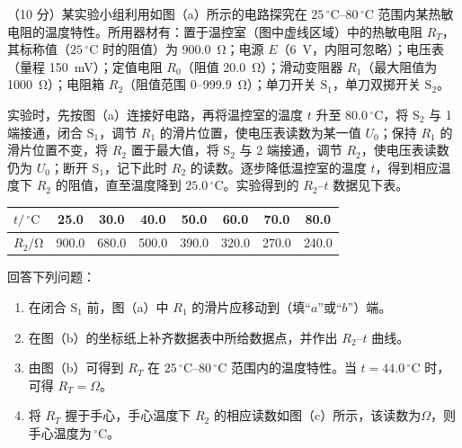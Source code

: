 \begin{question}
（10 分）某实验小组利用如图（a）所示的电路探究在 $25\,^{\circ}\mathrm{C}$--$80\,^{\circ}\mathrm{C}$ 范围内某热敏电阻的温度特性。所用器材有：置于温控室（图中虚线区域）中的热敏电阻 $R_{T}$，其标称值（$25\,^{\circ}\mathrm{C}$ 时的阻值）为 \SI{900.0}{\ohm}；电源 $E$（\SI{6}{\volt}，内阻可忽略）；电压表（量程 \SI{150}{\milli\volt}）；定值电阻 $R_{0}$（阻值 \SI{20.0}{\ohm}）；滑动变阻器 $R_{1}$（最大阻值为 \SI{1000}{\ohm}）；电阻箱 $R_{2}$（阻值范围 $0$--\SI{999.9}{\ohm}）；单刀开关 $\mathrm{S}_{1}$，单刀双掷开关 $\mathrm{S}_{2}$。


实验时，先按图（a）连接好电路，再将温控室的温度 $t$ 升至 $80.0\,^{\circ}\mathrm{C}$，将 $\mathrm{S}_{2}$ 与 1 端接通，闭合 $\mathrm{S}_{1}$，调节 $R_{1}$ 的滑片位置，使电压表读数为某一值 $U_{0}$；保持 $R_{1}$ 的滑片位置不变，将 $R_{2}$ 置于最大值，将 $\mathrm{S}_{2}$ 与 2 端接通，调节 $R_{2}$，使电压表读数仍为 $U_{0}$；断开 $\mathrm{S}_{1}$，记下此时 $R_{2}$ 的读数。逐步降低温控室的温度 $t$，得到相应温度下 $R_{2}$ 的阻值，直至温度降到 $25.0\,^{\circ}\mathrm{C}$。实验得到的 $R_{2}$--$t$ 数据见下表。

\begin{center}
\small
\begin{tabular}{@{}lccccccc@{}}
\toprule
$t/\,^{\circ}\mathrm{C}$ & 25.0 & 30.0 & 40.0 & 50.0 & 60.0 & 70.0 & 80.0\\
\midrule
$R_{2}/\si{\ohm}$ & 900.0 & 680.0 & 500.0 & 390.0 & 320.0 & 270.0 & 240.0\\
\bottomrule
\end{tabular}
\end{center}

回答下列问题：
\begin{enumerate}[leftmargin=2em, label=(\arabic*)]
  \item 在闭合 $\mathrm{S}_{1}$ 前，图（a）中 $R_{1}$ 的滑片应移动到\gkblank（填“$a$”或“$b$”）端。
  \item 在图（b）的坐标纸上补齐数据表中所给数据点，并作出 $R_{2}$--$t$ 曲线。
  \item 由图（b）可得到 $R_{T}$ 在 $25\,^{\circ}\mathrm{C}$--$80\,^{\circ}\mathrm{C}$ 范围内的温度特性。当 $t=44.0\,^{\circ}\mathrm{C}$ 时，可得 $R_{T}=$\gkblank $\Omega$。
  \item 将 $R_{T}$ 握于手心，手心温度下 $R_{2}$ 的相应读数如图（c）所示，该读数为\gkblank $\Omega$，则手心温度为\gkblank $\,^{\circ}\mathrm{C}$。
\end{enumerate}


\end{question}

